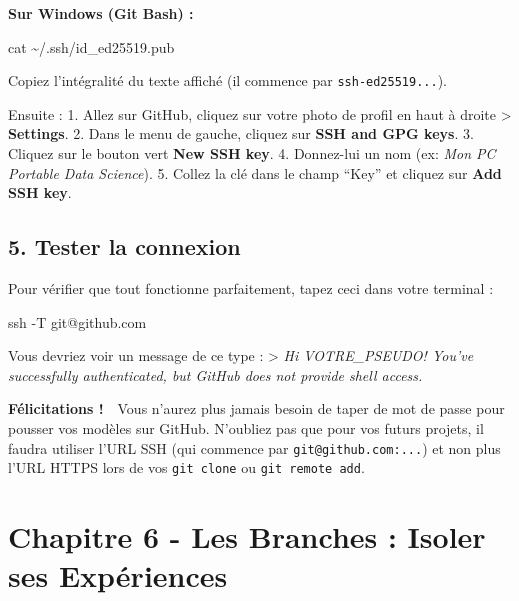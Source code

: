 \documentclass[
  letterpaper,
  DIV=11,
  numbers=noendperiod]{scrreprt}
\newenvironment{Shaded}{\begin{snugshade}}{\end{snugshade}}
\newcommand{\AttributeTok}[1]{\textcolor[rgb]{0.40,0.45,0.13}{#1}}
\newcommand{\FunctionTok}[1]{\textcolor[rgb]{0.28,0.35,0.67}{#1}}
\newcommand{\NormalTok}[1]{\textcolor[rgb]{0.00,0.23,0.31}{#1}}
\begin{document}
\textbf{Sur Windows (Git Bash) :}

\begin{Shaded}
\begin{Highlighting}[]
\FunctionTok{cat}\NormalTok{ \textasciitilde{}/.ssh/id\_ed25519.pub}
\end{Highlighting}
\end{Shaded}

Copiez l'intégralité du texte affiché (il commence par
\texttt{ssh-ed25519...}).

Ensuite : 1. Allez sur GitHub, cliquez sur votre photo de profil en haut
à droite \textgreater{} \textbf{Settings}. 2. Dans le menu de gauche,
cliquez sur \textbf{SSH and GPG keys}. 3. Cliquez sur le bouton vert
\textbf{New SSH key}. 4. Donnez-lui un nom (ex: \emph{Mon PC Portable
Data Science}). 5. Collez la clé dans le champ ``Key'' et cliquez sur
\textbf{Add SSH key}.

\subsection{5. Tester la connexion}\label{tester-la-connexion}

Pour vérifier que tout fonctionne parfaitement, tapez ceci dans votre
terminal :

\begin{Shaded}
\begin{Highlighting}[]
\FunctionTok{ssh} \AttributeTok{{-}T}\NormalTok{ git@github.com}
\end{Highlighting}
\end{Shaded}

Vous devriez voir un message de ce type : \textgreater{} \emph{Hi
VOTRE\_PSEUDO! You've successfully authenticated, but GitHub does not
provide shell access.}

\textbf{Félicitations ! 🎉} Vous n'aurez plus jamais besoin de taper de
mot de passe pour pousser vos modèles sur GitHub. N'oubliez pas que pour
vos futurs projets, il faudra utiliser l'URL SSH (qui commence par
\texttt{git@github.com:...}) et non plus l'URL HTTPS lors de vos
\texttt{git\ clone} ou \texttt{git\ remote\ add}.


\section{Chapitre 6 - Les Branches : Isoler ses
Expériences}\label{chapitre-6---les-branches-isoler-ses-expuxe9riences}
\end{document}

